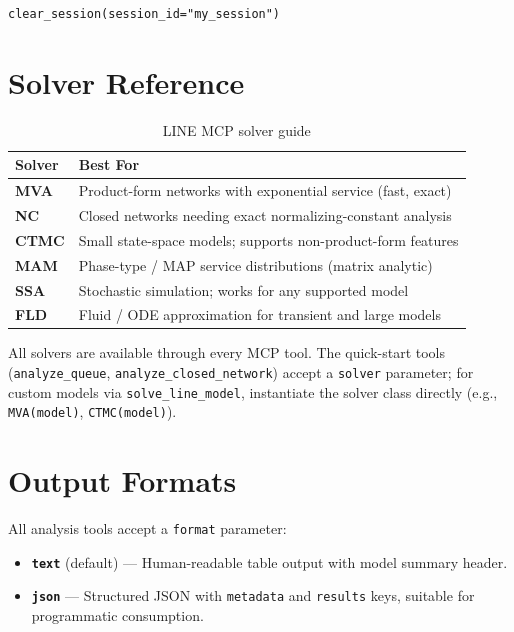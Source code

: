 \documentclass[11pt]{article}
\begin{document}
\begin{lstlisting}[style=pythonstyle]
clear_session(session_id="my_session")
\end{lstlisting}

\section{Solver Reference}

\begin{table}[h]
\centering
\begin{tabularx}{\textwidth}{lX}
\toprule
\textbf{Solver} & \textbf{Best For} \\
\midrule
\textbf{MVA} & Product-form networks with exponential service (fast, exact) \\
\textbf{NC} & Closed networks needing exact normalizing-constant analysis \\
\textbf{CTMC} & Small state-space models; supports non-product-form features \\
\textbf{MAM} & Phase-type / MAP service distributions (matrix analytic) \\
\textbf{SSA} & Stochastic simulation; works for any supported model \\
\textbf{FLD} & Fluid / ODE approximation for transient and large models \\
\bottomrule
\end{tabularx}
\caption{LINE MCP solver guide}
\end{table}

All solvers are available through every MCP tool. The quick-start tools (\texttt{analyze\_queue}, \texttt{analyze\_closed\_network}) accept a \texttt{solver} parameter; for custom models via \texttt{solve\_line\_model}, instantiate the solver class directly (e.g., \texttt{MVA(model)}, \texttt{CTMC(model)}).

\section{Output Formats}

All analysis tools accept a \texttt{format} parameter:

\begin{itemize}
    \item \textbf{\texttt{text}} (default) --- Human-readable table output with model summary header.
    \item \textbf{\texttt{json}} --- Structured JSON with \texttt{metadata} and \texttt{results} keys, suitable for programmatic consumption.
\end{itemize}
\end{document}
